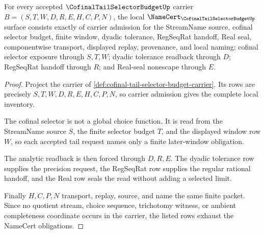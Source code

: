 \begin{theorem}
\label{thm:cofinal-tail-selector-budget-namecert-obligations}
For every accepted $\CofinalTailSelectorBudgetUp$ carrier $B=(S,T,W,D,R,E,H,C,P,N)$, the local $\NameCert_{\CofinalTailSelectorBudgetUp}$ surface consists exactly of carrier admission for the StreamName source, cofinal selector budget, finite window, dyadic tolerance, RegSeqRat handoff, Real seal, componentwise transport, displayed replay, provenance, and local naming; cofinal selector exposure through $S,T,W$; dyadic tolerance readback through $D$; RegSeqRat handoff through $R$; and Real-seal nonescape through $E$.
\end{theorem}
\begin{proof}
Project the carrier of \autoref{def:cofinal-tail-selector-budget-carrier}. Its rows are precisely $S,T,W,D,R,E,H,C,P,N$, so carrier admission gives the complete local inventory.

The cofinal selector is not a global choice function. It is read from the StreamName source $S$, the finite selector budget $T$, and the displayed window row $W$, so each accepted tail request names only a finite later-window obligation.

The analytic readback is then forced through $D,R,E$. The dyadic tolerance row supplies the precision request, the RegSeqRat row supplies the regular rational handoff, and the Real row seals the read without adding a selected limit.

Finally $H,C,P,N$ transport, replay, source, and name the same finite packet. Since no quotient stream, choice sequence, trichotomy witness, or ambient completeness coordinate occurs in the carrier, the listed rows exhaust the NameCert obligations.
\end{proof}

